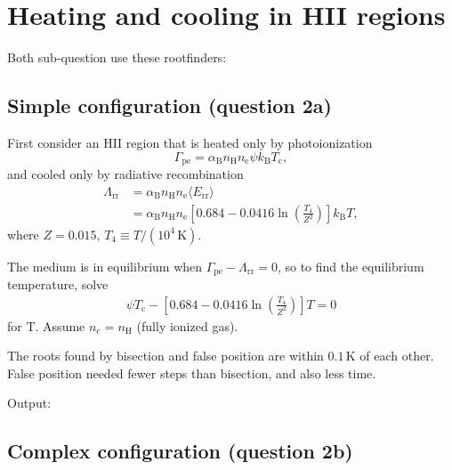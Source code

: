 \section{Heating and cooling in HII regions}

Both sub-question use these rootfinders:


\subsection{Simple configuration (question 2a)}

First consider an HII region that is heated only by photoionization
\begin{equation}\label{eqn:heating}
\Gamma_\mathrm{pe} = \alpha_\mathrm{B} n_\mathrm{H} n_\mathrm{e} \psi k_\mathrm{B} T_\mathrm{c},
\end{equation}
and cooled only by radiative recombination
\begin{equation}\label{eqn:cooling}
\begin{split}
\Lambda_\mathrm{rr} &= \alpha_\mathrm{B} n_\mathrm{H} n_\mathrm{e} \langle E_\mathrm{rr} \rangle \\
&= \alpha_\mathrm{B} n_\mathrm{H} n_\mathrm{e} \left[ 0.684 - 0.0416 \ln\left(\frac{T_4}{Z^2}\right) \right] k_\mathrm{B} T,
\end{split}
\end{equation}
where $Z=0.015$, $T_4 \equiv T/(10^4\,\mathrm{K})$.


The medium is in equilibrium when $\Gamma_\mathrm{pe} - \Lambda_\mathrm{rr} = 0$, so to find the equilibrium temperature, solve
\begin{equation}
\begin{split}
\psi T_\mathrm{c} - \left[ 0.684 - 0.0416 \ln\left(\frac{T_4}{Z^2}\right) \right] T = 0
\end{split}
\end{equation}
for T. Assume $n_e = n_\mathrm{H}$ (fully ionized gas).

The roots found by bisection and false position are within $0.1\,\mathrm{K}$ of each other.
False position needed fewer steps than bisection, and also less time.



Output:





\subsection{Complex configuration (question 2b)}

